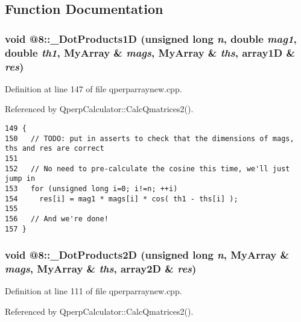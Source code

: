 \subsection{Function Documentation}
\subsubsection{\setlength{\rightskip}{0pt plus 5cm}void @8::\_\-DotProducts1D (unsigned long {\em n}, double {\em mag1}, double {\em th1}, MyArray \& {\em mags}, MyArray \& {\em ths}, array1D \& {\em res})\hspace{0.3cm}{\tt  [static]}}\label{qperparraynew_8cpp_aea824af3e9dc625dd755fe24f0492b2}




Definition at line 147 of file qperparraynew.cpp.

Referenced by QperpCalculator::CalcQmatrices2().

\begin{Code}\begin{verbatim}149 {
150   // TODO: put in asserts to check that the dimensions of mags, ths and res are correct
151 
152   // No need to pre-calculate the cosine this time, we'll just jump in
153   for (unsigned long i=0; i!=n; ++i)
154     res[i] = mag1 * mags[i] * cos( th1 - ths[i] );
155 
156   // And we're done!
157 }
\end{verbatim}
\end{Code}


\subsubsection{\setlength{\rightskip}{0pt plus 5cm}void @8::\_\-DotProducts2D (unsigned long {\em n}, MyArray \& {\em mags}, MyArray \& {\em ths}, array2D \& {\em res})\hspace{0.3cm}{\tt  [static]}}\label{qperparraynew_8cpp_3b87a5052e73e5de13161681e25cf1fa}




Definition at line 111 of file qperparraynew.cpp.

Referenced by QperpCalculator::CalcQmatrices2().

